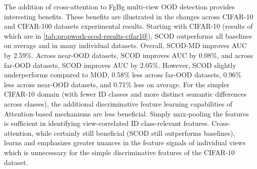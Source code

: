 
The addition of cross-attention to FgBg multi-view OOD detection provides interesting benefits. These benefits are illustrated in the changes across CIFAR-10 and CIFAR-100 datasets experimental results. Starting with CIFAR-10 (results of which are in \ref{tab:propwork-scod-results-cifar10}), SCOD outperforms all baselines on average and in many individual datasets. Overall, SCOD-MD improves AUC by 2.59\%. Across near-OOD datasets, SCOD improves AUC by 0.08\%, and across far-OOD datasets, SCOD improves AUC by 2.05\%. However, SCOD slightly underperforms compared to MOD, 0.58\% less across far-OOD datasets, 0.96\% less across near-OOD datasets, and 0.71\% less on average. For the simpler CIFAR-10 domain (with fewer ID classes and more distinct semantic differences across classes), the additional discriminative feature learning capabilities of Attention-based mechanisms are less beneficial. Simply max-pooling the features is sufficient in identifying view-correlated ID class-relevant features. Cross-attention, while certainly still beneficial (SCOD still outperforms baselines), learns and emphasizes greater nuances in the feature signals of individual views which is unnecessary for the simple discriminative features of the CIFAR-10 dataset.

